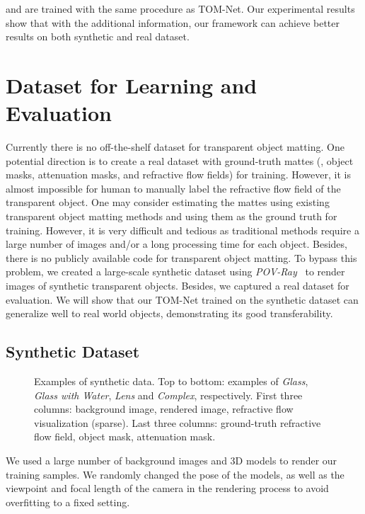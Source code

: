 \TOMNetTrimap and \TOMNetBg are trained with the same procedure as \hbox{TOM-Net}.
Our experimental results show that with the additional information, our framework can achieve better results on both synthetic and real dataset.

\section{Dataset for Learning and Evaluation}
\label{sec:dataset}
Currently there is no off-the-shelf dataset for transparent object matting. 
One potential direction is to create a real dataset with ground-truth mattes (\ie, object masks, attenuation masks, and refractive flow fields) for training. 
However, it is almost impossible for human to manually label the refractive flow field of the transparent object.
One may consider estimating the mattes using existing transparent object matting methods and using them as the ground truth for training.
However, it is very difficult and tedious as traditional methods require a large number of images and/or a long processing time for each object. 
Besides, there is no publicly available code for transparent object matting.
To bypass this problem, we created a large-scale synthetic dataset using \emph{POV-Ray}~\cite{povray} to render images of synthetic transparent objects.
Besides, we captured a real dataset for evaluation. We will show that our TOM-Net trained on the synthetic dataset can generalize well to real world objects, demonstrating its good transferability.

\subsection{Synthetic Dataset} 
\label{sub:Synthetic Dataset}

\begin{figure}[tbp] \centering
    
    \caption[Examples of synthetic data]{Examples of synthetic data. Top to bottom: examples of \emph{Glass}, \emph{Glass with Water}, \emph{Lens} and \emph{Complex}, respectively. First three columns: background image, rendered image, refractive flow visualization (sparse). Last three columns: ground-truth refractive flow field, object mask, attenuation mask.} 
    \label{fig:syn_data_samples}
\end{figure}

We used a large number of background images and 3D models to render our training samples. We randomly changed the pose of the models, as well as the viewpoint and focal length of the camera in the rendering process to avoid overfitting to a fixed setting.

